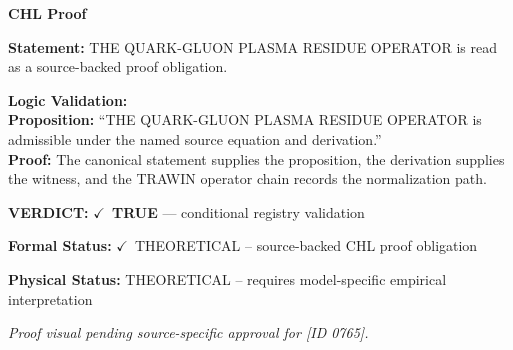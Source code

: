 \vspace{0.45em}
\noindent\textbf{CHL Proof}\par
\textbf{Statement:} THE QUARK-GLUON PLASMA RESIDUE OPERATOR is read as a source-backed proof obligation.

\textbf{Logic Validation:}\\
\textbf{Proposition:} ``THE QUARK-GLUON PLASMA RESIDUE OPERATOR is admissible under the named source equation and derivation.''\\
\textbf{Proof:} The canonical statement supplies the proposition, the derivation supplies the witness, and the TRAWIN operator chain records the normalization path.

\textbf{VERDICT:} \ensuremath{\checkmark}\ \textbf{TRUE} --- conditional registry validation

\textbf{Formal Status:} \ensuremath{\checkmark}\ THEORETICAL -- source-backed CHL proof obligation

\textbf{Physical Status:} THEORETICAL -- requires model-specific empirical interpretation
\par\vspace{0.45em}
\par
\vfill
\begingroup\footnotesize\itshape
Proof visual pending source-specific approval for [ID 0765].
\par\endgroup
\vfill
\endgroup
\endgroup
